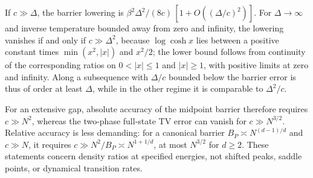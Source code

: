 If $c\gg\Delta$, the barrier lowering is
$\beta^2\Delta^2/(8c)\,[1+O((\Delta/c)^2)]$.
For $\Delta\to\infty$ and inverse temperature bounded
away from zero and infinity, the lowering vanishes if and only if
$c\gg\Delta^2$, because $\log\cosh x$ lies between a positive
constant times $\min(x^2,|x|)$ and $x^2/2$; the lower bound follows
from continuity of the corresponding ratios on $0<|x|\le1$ and
$|x|\ge1$, with positive limits at zero and infinity. Along a
subsequence with $\Delta/c$ bounded below the barrier error is thus
of order at least $\Delta$, while in the other regime it is
comparable to $\Delta^2/c$.

For an extensive gap, absolute accuracy of the midpoint barrier
therefore requires $c\gg N^2$, whereas the two-phase full-state TV
error can vanish for $c\gg N^{3/2}$. Relative accuracy is less
demanding: for a canonical barrier $B_P\asymp N^{(d-1)/d}$ and
$c\gg N$, it requires $c\gg N^2/B_P\asymp N^{1+1/d}$, at most
$N^{3/2}$ for $d\ge2$. These statements concern density ratios at
specified energies, not shifted peaks, saddle points, or dynamical
transition rates.
